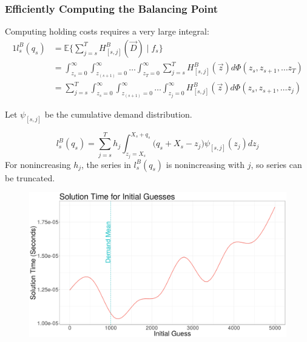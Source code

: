 \documentclass{beamer}
\newcommand{\EX}{\mathbb{E}}
\begin{document}

\begin{frame}[shrink=10]
\frametitle{Efficiently Computing the Balancing Point}
Computing holding costs requires a very large integral:
\begin{alignat*}{1}
	l_s^B(q_s) &= \EX \bigg\{\sum_{j=s}^T H_{[s,j]}^B(\vec{D}) \; | \; f_s \bigg\} \\
		&= \int_{z_s=0}^{\infty} \int_{z_{(s+1)}=0}^{\infty}\dots \int_{z_T=0}^{\infty}\sum_{j=s}^T  H_{[s,j]}^B(\vec{z}) d\Phi(z_s, z_{s+1}, \dots z_T) \\
		&= \sum_{j=s}^T \int_{z_s=0}^{\infty} \int_{z_{(s+1)}=0}^{\infty}\dots \int_{z_j=0}^{\infty} H_{[s,j]}^B(\vec{z}) d\Phi(z_s, z_{s+1}, \dots z_j)
\end{alignat*}

Let $\psi_{[s,j]}$ be the cumulative demand distribution. 

\begin{equation*}
	l_s^B(q_s) = \sum_{j=s}^T  h_j \int_{z_j=X_s}^{X_s + q_s}\bigg(q_s + X_s - z_j \bigg) \psi_{[s,j]} (z_j) dz_j
\end{equation*}
For nonincreasing $h_j$, the series in $l_s^B(q_s)$ is nonincreasing with $j$, so series can be truncated.
\end{frame}


\begin{frame}
\begin{figure}
\includegraphics[width=\textwidth]{solution_times_slides}
\end{figure}
\end{frame}


\begin{frame}


\end{frame}

\end{document}
